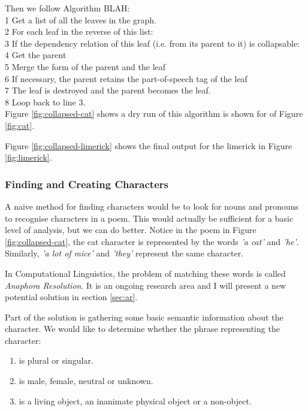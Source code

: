 Then we follow Algorithm BLAH:\\
1 Get a list of all the leaves in the graph.\\
2 For each leaf in the reverse of this list:\\
3	If the dependency relation of this leaf (i.e. from its parent to it) is collapsable:\\
4		Get the parent\\
5		Merge the form of the parent and the leaf\\
6		If necessary, the parent retains the part-of-speech tag of the leaf\\
7		The leaf is destroyed and the parent becomes the leaf.\\
8		Loop back to line 3.\\

Figure \ref{fig:collapsed-cat} shows a dry run of this algorithm is shown for of Figure \ref{fig:cat}.

Figure \ref{fig:collapsed-limerick} shows the final output for the limerick in Figure \ref{fig:limerick}.

\subsubsection{Finding and Creating Characters}
\label{sec:characters} 

A naive method for finding characters would be to look for nouns and pronouns to recognise characters in a poem. This would actually be sufficient for a basic level of analysis, but we can do better. Notice in the poem in Figure \ref{fig:collapsed-cat}, the cat character is represented by the words \textit{'a cat'} and \textit{'he'}. Similarly, \textit{'a lot of mice'} and \textit{'they'} represent the same character.

In Computational Linguistics, the problem of matching these words is called \textit{Anaphora Resolution}. It is an ongoing research area and I will present a new potential solution in section \ref{sec:ar}.

Part of the solution is gathering some basic semantic information about the character. We would like to determine whether the phrase representing the character:

\begin{enumerate}
\item{is plural or singular.}
\item{is male, female, neutral or unknown.}
\item{is a living object, an inanimate physical object or a non-object.}
\end{enumerate}

